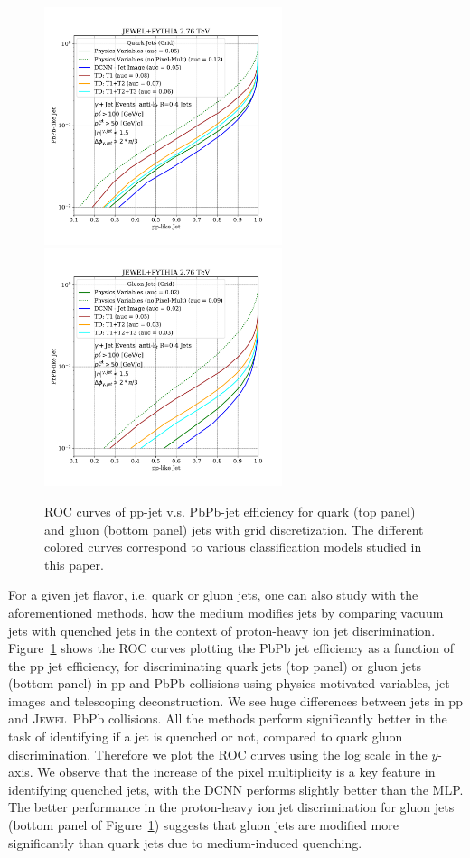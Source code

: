 \documentclass[notoc,preprintnumbers]{JHEP3}
\newcommand{\jw}{\textsc{Jewel}~}
\begin{document}
\begin{figure}[t]
	   \centering
	   \includegraphics[width=0.62\textwidth]{Fig17a}
	   \includegraphics[width=0.62\textwidth]{Fig17b}
	   \caption{ROC curves of pp-jet v.s. PbPb-jet efficiency for quark (top panel) and gluon (bottom panel) jets with grid discretization. The different colored curves correspond to various classification models studied in this paper.}
\label{fig:ROC_qq_gg}
\end{figure}

For a given jet flavor, i.e. quark or gluon jets, one can also study with the aforementioned methods, how the medium modifies jets by comparing vacuum jets with quenched jets in the context of proton-heavy ion jet discrimination. Figure~\ref{fig:ROC_qq_gg} shows the ROC curves plotting the PbPb jet efficiency as a function of the pp jet efficiency, for discriminating quark jets (top panel) or gluon jets (bottom panel) in pp and PbPb collisions using physics-motivated variables, jet images and telescoping deconstruction. We see huge differences between jets in pp and \jw PbPb collisions. All the methods perform significantly better in the task of identifying if a jet is quenched or not, compared to quark gluon discrimination. Therefore we plot the ROC curves using the log scale in the $y$-axis. We observe that the increase of the pixel multiplicity is a key feature in identifying quenched jets, with the DCNN performs slightly better than the MLP. The better performance in the proton-heavy ion jet discrimination for gluon jets (bottom panel of Figure~\ref{fig:ROC_qq_gg}) suggests that gluon jets are modified more significantly than quark jets due to medium-induced quenching.
\end{document}
